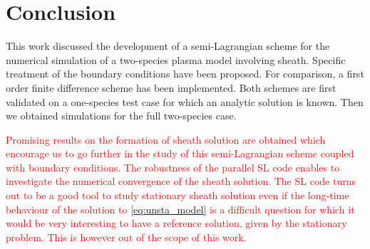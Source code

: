 \documentclass{article}
\numberwithin{equation}{section}
\begin{document}
\section{Conclusion}

This work discussed the development of a semi-Lagrangian scheme for the numerical simulation of a two-species plasma model involving sheath. Specific treatment of the boundary conditions have been proposed. For comparison, a first order finite difference scheme has been implemented. Both schemes are first validated on a one-species test case for which an analytic solution is known. Then we obtained simulations for the full two-species case. 

\textcolor{red}{
Promising results on the formation of sheath solution are obtained 
which encourage us  to go further in the study of this semi-Lagrangian scheme coupled with boundary conditions. 
The robustness of the parallel SL code enables to investigate the numerical convergence of the sheath solution. 
The SL code turns out to be a good tool to study stationary sheath solution even if the long-time behaviour 
of the solution to \eqref{eq:unsta_model} is a difficult question for which it would be very interesting to have a reference solution, given by the stationary problem. This is however out of the scope of this work.}







\end{document}
